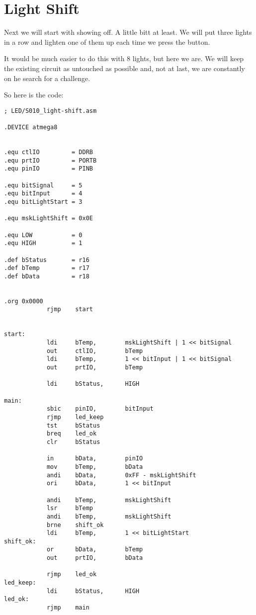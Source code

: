 \section{Light Shift}

Next we will start with showing off. A little bitt at least. We will put three lights in a row and lighten one of them up each time we press the button.

It would be much easier to do this with 8 lights, but here we are. We will keep the existing circuit as untouched as possible and, not at last, we are constantly on he search for a challenge.

So here is the code:

\begin{lstlisting}
; LED/S010_light-shift.asm

.DEVICE atmega8


.equ ctlIO         = DDRB
.equ prtIO         = PORTB
.equ pinIO         = PINB

.equ bitSignal     = 5
.equ bitInput      = 4
.equ bitLightStart = 3

.equ mskLightShift = 0x0E

.equ LOW           = 0
.equ HIGH          = 1

.def bStatus       = r16
.def bTemp         = r17
.def bData         = r18


.org 0x0000
            rjmp    start


start:
            ldi     bTemp,        mskLightShift | 1 << bitSignal
            out     ctlIO,        bTemp
            ldi     bTemp,        1 << bitInput | 1 << bitSignal
            out     prtIO,        bTemp

            ldi     bStatus,      HIGH

main:
            sbic    pinIO,        bitInput
            rjmp    led_keep
            tst     bStatus
            breq    led_ok
            clr     bStatus

            in      bData,        pinIO
            mov     bTemp,        bData
            andi    bData,        0xFF - mskLightShift
            ori     bData,        1 << bitInput

            andi    bTemp,        mskLightShift
            lsr     bTemp
            andi    bTemp,        mskLightShift
            brne    shift_ok
            ldi     bTemp,        1 << bitLightStart
shift_ok:
            or      bData,        bTemp
            out     prtIO,        bData

            rjmp    led_ok
led_keep:
            ldi     bStatus,      HIGH
led_ok:
            rjmp    main
\end{lstlisting}

